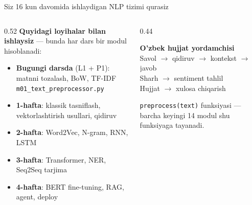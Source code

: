 \documentclass[aspectratio=169,11pt]{beamer}
\begin{document}
\begin{frame}{Siz 16 kun davomida ishlaydigan NLP tizimi qurasiz}
  \begin{columns}[T]
    \begin{column}{0.52\textwidth}
      \textbf{Quyidagi loyihalar bilan ishlaysiz} --- bunda har dars bir modul hisoblanadi:\\[4pt]
      \small
      \begin{itemize}\setlength\itemsep{3pt}
        \item[\textbullet] \textbf{Bugungi darsda} (L1 + P1): matnni tozalash, BoW, TF-IDF\\
              \texttt{\footnotesize m01\_text\_preprocessor.py}
        \item[\textbullet] \textbf{1-hafta}: klassik tasniflash, vektorlashtirish usullari, qidiruv
        \item[\textbullet] \textbf{2-hafta}: Word2Vec, N-gram, RNN, LSTM
        \item[\textbullet] \textbf{3-hafta}: Transformer, NER, Seq2Seq tarjima
        \item[\textbullet] \textbf{4-hafta}: BERT fine-tuning, RAG, agent, deploy
      \end{itemize}
    \end{column}
    \begin{column}{0.44\textwidth}
      \begin{tcolorbox}[okbox,title=Yakuniy hosil bo'ladigan mahsulot]
        \small\textbf{O'zbek hujjat yordamchisi}\\[3pt]
        \footnotesize
        Savol $\to$ qidiruv $\to$ kontekst $\to$ javob\\[2pt]
        Sharh $\to$ sentiment tahlil\\[2pt]
        Hujjat $\to$ xulosa chiqarish
      \end{tcolorbox}
      \vspace{4pt}
      \begin{tcolorbox}[warnbox,title=Bugungi darsning umumiy hissasi]
        \footnotesize
        \texttt{preprocess(text)} funksiyasi ---
        barcha keyingi 14 modul shu funksiyaga
        tayanadi.
      \end{tcolorbox}
    \end{column}
  \end{columns}
\end{frame}
\end{document}
